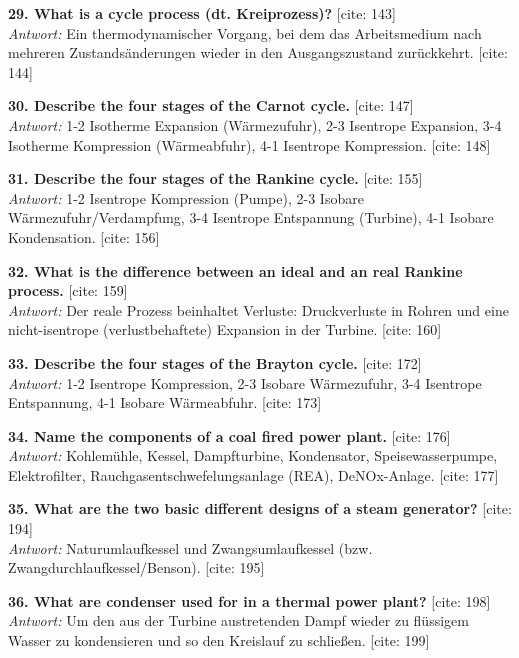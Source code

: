 \documentclass[11pt,a4paper]{article}
\begin{document}
\textbf{29. What is a cycle process (dt. Kreiprozess)?} [cite: 143]\\
\textit{Antwort:} Ein thermodynamischer Vorgang, bei dem das Arbeitsmedium nach mehreren Zustandsänderungen wieder in den Ausgangszustand zurückkehrt. [cite: 144]

\vspace{0.5cm}
\textbf{30. Describe the four stages of the Carnot cycle.} [cite: 147]\\
\textit{Antwort:} 1-2 Isotherme Expansion (Wärmezufuhr), 2-3 Isentrope Expansion, 3-4 Isotherme Kompression (Wärmeabfuhr), 4-1 Isentrope Kompression. [cite: 148]

\vspace{0.5cm}
\textbf{31. Describe the four stages of the Rankine cycle.} [cite: 155]\\
\textit{Antwort:} 1-2 Isentrope Kompression (Pumpe), 2-3 Isobare Wärmezufuhr/Verdampfung, 3-4 Isentrope Entspannung (Turbine), 4-1 Isobare Kondensation. [cite: 156]

\vspace{0.5cm}
\textbf{32. What is the difference between an ideal and an real Rankine process.} [cite: 159]\\
\textit{Antwort:} Der reale Prozess beinhaltet Verluste: Druckverluste in Rohren und eine nicht-isentrope (verlustbehaftete) Expansion in der Turbine. [cite: 160]

\vspace{0.5cm}
\textbf{33. Describe the four stages of the Brayton cycle.} [cite: 172]\\
\textit{Antwort:} 1-2 Isentrope Kompression, 2-3 Isobare Wärmezufuhr, 3-4 Isentrope Entspannung, 4-1 Isobare Wärmeabfuhr. [cite: 173]

\vspace{0.5cm}
\textbf{34. Name the components of a coal fired power plant.} [cite: 176]\\
\textit{Antwort:} Kohlemühle, Kessel, Dampfturbine, Kondensator, Speisewasserpumpe, Elektrofilter, Rauchgasentschwefelungsanlage (REA), DeNOx-Anlage. [cite: 177]

\vspace{0.5cm}
\textbf{35. What are the two basic different designs of a steam generator?} [cite: 194]\\
\textit{Antwort:} Naturumlaufkessel und Zwangsumlaufkessel (bzw. Zwangdurchlaufkessel/Benson). [cite: 195]

\vspace{0.5cm}
\textbf{36. What are condenser used for in a thermal power plant?} [cite: 198]\\
\textit{Antwort:} Um den aus der Turbine austretenden Dampf wieder zu flüssigem Wasser zu kondensieren und so den Kreislauf zu schließen. [cite: 199]
\end{document}
